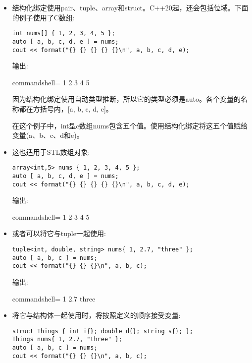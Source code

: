 \begin{itemize}
\item 
结构化绑定使用pair、tuple、array和struct。C++20起，还会包括位域。下面的例子使用了C数组:

\begin{lstlisting}[style=styleCXX]
int nums[] { 1, 2, 3, 4, 5 };
auto [ a, b, c, d, e ] = nums;
cout << format("{} {} {} {} {}\n", a, b, c, d, e);
\end{lstlisting}

输出:

\begin{tcblisting}{commandshell={}}
1 2 3 4 5
\end{tcblisting}

因为结构化绑定使用自动类型推断，所以它的类型必须是auto。各个变量的名称都在方括号内，[a, b, c, d, e]。

在这个例子中，int型c数组nums包含五个值。使用结构化绑定将这五个值赋给变量(a、b、c、d和e)。

\item 
这也适用于STL数组对象:

\begin{lstlisting}[style=styleCXX]
array<int,5> nums { 1, 2, 3, 4, 5 };
auto [ a, b, c, d, e ] = nums;
cout << format("{} {} {} {} {}\n", a, b, c, d, e);
\end{lstlisting}

输出:

\begin{tcblisting}{commandshell={}}
1 2 3 4 5
\end{tcblisting}

\item 
或者可以将它与tuple一起使用:

\begin{lstlisting}[style=styleCXX]
tuple<int, double, string> nums{ 1, 2.7, "three" };
auto [ a, b, c ] = nums;
cout << format("{} {} {}\n", a, b, c);
\end{lstlisting}

输出:

\begin{tcblisting}{commandshell={}}
1 2.7 three
\end{tcblisting}

\item 
将它与结构体一起使用时，将按照定义的顺序接受变量:

\begin{lstlisting}[style=styleCXX]
struct Things { int i{}; double d{}; string s{}; };
Things nums{ 1, 2.7, "three" };
auto [ a, b, c ] = nums;
cout << format("{} {} {}\n", a, b, c);
\end{lstlisting}


\end{itemize}
